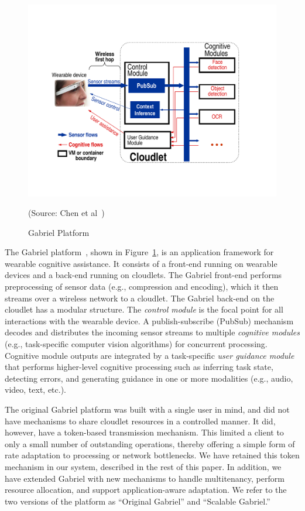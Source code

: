 \begin{figure}
\centering
\includegraphics[width=0.8\linewidth]{FIGS/fig-backend-structure-simple-crop.pdf}
\begin{captiontext}
{\rm (Source: Chen et al~\cite{chen2017empirical})}
\end{captiontext}
\caption{\small Gabriel Platform}
\label{fig:gabriel}
\end{figure}

The Gabriel platform~\cite{ha2014towards,chen2017empirical}, shown in
Figure~\ref{fig:gabriel}, is an application framework for wearable cognitive
assistance. It consists of a front-end running on wearable devices and a
back-end running on cloudlets. The Gabriel front-end performs preprocessing of
sensor data (e.g., compression and encoding), which it then streams over a
wireless network to a cloudlet.  The Gabriel back-end on the cloudlet has a
modular structure. The {\em control module} is the focal point for all
interactions with the wearable device.  A publish-subscribe (PubSub) mechanism
decodes and distributes the incoming sensor streams to multiple {\em cognitive
modules} (e.g., task-specific computer vision algorithms) for concurrent
processing. Cognitive module outputs are integrated by a task-specific {\em user
guidance module} that performs higher-level cognitive processing such as
inferring task state, detecting errors, and generating guidance in one or more
modalities (e.g., audio, video, text, etc.).

The original Gabriel platform was built with a single user in mind,
and did not have mechanisms to share cloudlet resources in a
controlled manner.  It did, however, have a token-based transmission
mechanism.  This limited a client to only a small number of
outstanding operations, thereby offering a simple form of rate
adaptation to processing or network bottlenecks.  We have retained
this token mechanism in our system, described in the rest of this paper.
In addition, we have extended Gabriel with new mechanisms to handle
multitenancy, perform resource allocation, and support
application-aware adaptation.  We refer to the two versions of the
platform as ``Original Gabriel'' and ``Scalable Gabriel.''

